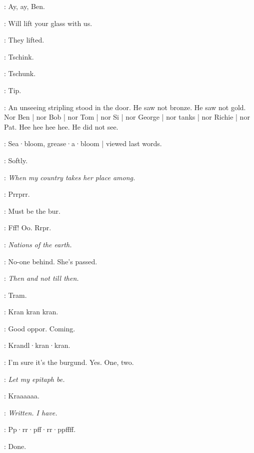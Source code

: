 \simon:
Ay,
ay,
Ben.

\dollard:
Will lift your glass with us.

:
They lifted.


:
Tschink.

:
Tschunk.

\stripling:
Tip.

:
An unseeing stripling stood in the door.
He saw not bronze.
He saw not gold.
Nor Ben |
nor Bob |
nor Tom |
nor Si |
nor George |
nor tanks |
nor Richie |
nor Pat.
Hee hee hee hee.
He did not see.

:
Sea·bloom,
grease·a·bloom |
viewed last words.

\BloomIntA:
Softly.

\emmet:
\emph{When my country takes her place among.}

:
Prrprr.

\BloomIntA:
Must be the bur.

:
Fff!
Oo.
Rrpr.

\emmet:
\emph{Nations of the earth.}

\BloomIntA:
No-one behind.
She's passed.

\emmet:
\emph{Then and not till then.}

\BloomIntA:
Tram.

:
Kran kran kran.

\BloomIntA:
Good oppor.
Coming.

:
Krandl·kran·kran.

\BloomIntA:
I'm sure it's the burgund.
Yes.
One,
two.

\emmet:
\emph{Let my epitaph be.}

:
Kraaaaaa.

\emmet:
\emph{Written.
I have.}

:
Pp·rr·pff·rr·ppffff.

\BloomIntA:
Done.
